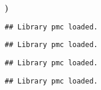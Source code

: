 \documentclass{elsarticle}
\makeatletter
\newcommand{\hlkeyword}[1]{\textbf{#1}}%
\newcommand{\hlstd}[1]{\textcolor[rgb]{0,0,0}{#1}}%
\newenvironment{kframe}{%
 \def\FrameCommand##1{\hskip\@totalleftmargin \hskip-\fboxsep
 \colorbox{shadecolor}{##1}\hskip-\fboxsep
     \hskip-\linewidth \hskip-\@totalleftmargin \hskip\columnwidth}%
 \MakeFramed {\advance\hsize-\width
   \@totalleftmargin\z@ \linewidth\hsize
   \@setminipage}}%
 {\par\unskip\endMakeFramed}
\newenvironment{knitrout}{}{} %
\makeatother
\begin{document}
\begin{knitrout}
{\begin{kframe}
\begin{flushleft}
\hlstd{}\hlkeyword{\usebox{\hlnormalsizeboxclosebrace}}\hlkeyword{)}\mbox{}
\normalfont
\end{flushleft}
\begin{verbatim}
## Library pmc loaded.
\end{verbatim}
\begin{verbatim}
## Library pmc loaded.
\end{verbatim}
\begin{verbatim}
## Library pmc loaded.
\end{verbatim}
\begin{verbatim}
## Library pmc loaded.
\end{verbatim}
\end{kframe}}
\end{knitrout}
\end{document}
